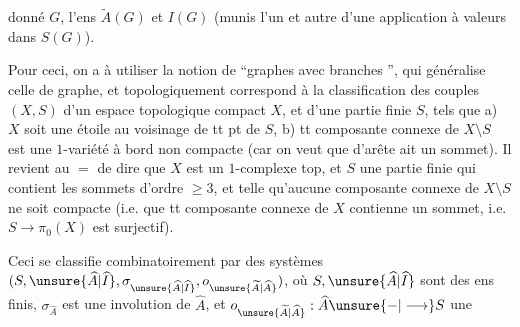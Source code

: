 donné $G$, l'ens $\widetilde A(G)$ et $I(G)$ (munis l'un et autre d'une application  à valeurs dans $S(G)$).

Pour ceci, on a à utiliser la notion de ``graphes avec branches '', qui généralise celle de graphe, et topologiquement correspond à la classification des  couples $(X,S)$ d'un espace topologique compact $X$, et d'une partie finie $S$, tels que a) $X$ soit une étoile au voisinage de tt pt de $S$,  b)  tt composante connexe de $X\setminus S$ est une $1$-variété à bord non compacte (car on veut que   d'arête ait un sommet). Il revient au $=$ de dire que $X$ est un $1$-complexe top, et $S$ une partie finie qui contient les sommets d'ordre $\geq3$, et telle qu'aucune composante connexe de $X\setminus S$ ne soit compacte (i.e. que tt composante connexe de $X$ contienne un sommet, i.e. $S\longrightarrow\pi_0(X)$ est surjectif).

Ceci se classifie combinatoirement par des systèmes $(S,\unsure{\widehat A|\widehat I},\sigma_{\unsure{\widehat A|\widehat I}},o_{\unsure{\widetilde A|\widehat A}})$, où  $S,\unsure{\widehat A|\widehat I}$ sont des ens finis, $\sigma_{\widehat A}$ est une involution de $\widehat A$, et $o_{\unsure{\widetilde A|\widehat A}}:\widehat A\unsure{-|\longrightarrow}S$ une
